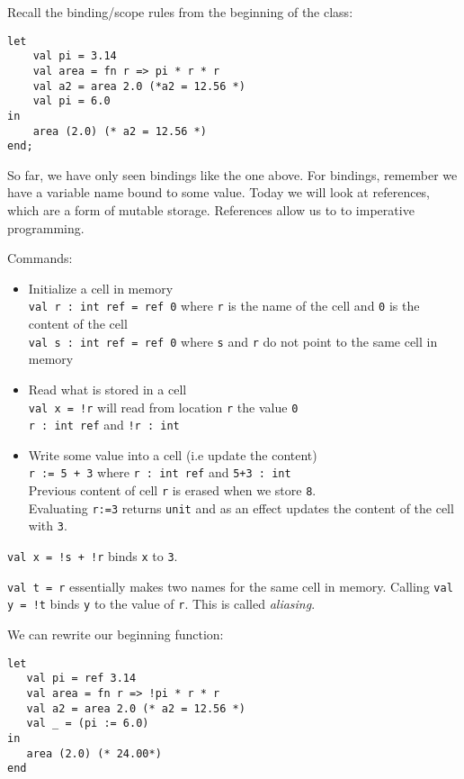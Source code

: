 \documentclass[11pt]{article}
\begin{document}
Recall the binding/scope rules from the beginning of the class:
\begin{verbatim}
let 
    val pi = 3.14
    val area = fn r => pi * r * r
    val a2 = area 2.0 (*a2 = 12.56 *)
    val pi = 6.0
in
    area (2.0) (* a2 = 12.56 *)
end;
\end{verbatim}

So far, we have only seen bindings like the one above. For bindings, remember we have a variable name bound to some value.
Today we will look at references, which are a form of mutable storage. References allow us to to imperative programming.

Commands:
\begin{itemize}
    \item Initialize a cell in memory \\
            \verb~val r : int ref = ref 0~ where \verb~r~ is the name of the cell and \verb~0~ is the content of the cell \\
            \verb~val s : int ref = ref 0~ where \verb~s~ and \verb~r~ do not point to the same cell in memory
    \item Read what is stored in a cell \\
            \verb~val x = !r~ will read from location \verb~r~ the value \verb~0~ \\
            \verb~r : int ref~ and \verb~!r : int~
    \item Write some value into a cell (i.e update the content) \\
            \verb~r := 5 + 3~ where \verb~r : int ref~ and \verb~5+3 : int~ \\
            Previous content of cell \verb~r~ is erased when we store \verb~8~. \\
            Evaluating \verb~r:=3~ returns \verb~unit~ and as an effect updates the content of the cell with \verb~3~.
\end{itemize}

\verb~val x = !s + !r~ binds \verb~x~ to \verb~3~.

\verb~val t = r~ essentially makes two names for the same cell in memory. Calling \verb~val y = !t~ binds \verb~y~ to the value of \verb~r~. This is called \emph{aliasing}.

We can rewrite our beginning function:
\begin{verbatim}
let
   val pi = ref 3.14
   val area = fn r => !pi * r * r
   val a2 = area 2.0 (* a2 = 12.56 *)
   val _ = (pi := 6.0)
in
   area (2.0) (* 24.00*)
end
\end{verbatim}
\end{document}

